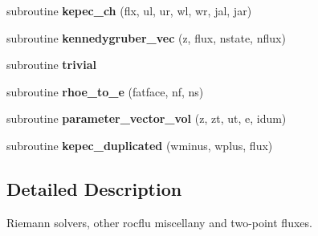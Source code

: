 \begin{DoxyCompactItemize}
\item 
\hypertarget{fluxfn_8f_a59e9fe9c53edce67292dbcb47f7c3853}{subroutine {\bfseries kepec\-\_\-ch} (flx, ul, ur, wl, wr, jal, jar)}\label{fluxfn_8f_a59e9fe9c53edce67292dbcb47f7c3853}

\item 
\hypertarget{fluxfn_8f_a25cb36e6b50d76a9d6d788b9c3656808}{subroutine {\bfseries kennedygruber\-\_\-vec} (z, flux, nstate, nflux)}\label{fluxfn_8f_a25cb36e6b50d76a9d6d788b9c3656808}

\item 
\hypertarget{fluxfn_8f_abf0b8321ecdfdf41f3a2259935c250c9}{subroutine {\bfseries trivial}}\label{fluxfn_8f_abf0b8321ecdfdf41f3a2259935c250c9}

\item 
\hypertarget{fluxfn_8f_a3263d754d306110417d51b61cc67a28b}{subroutine {\bfseries rhoe\-\_\-to\-\_\-e} (fatface, nf, ns)}\label{fluxfn_8f_a3263d754d306110417d51b61cc67a28b}

\item 
\hypertarget{fluxfn_8f_a3264aa63a47559ee42fcf884419d86ca}{subroutine {\bfseries parameter\-\_\-vector\-\_\-vol} (z, zt, ut, e, idum)}\label{fluxfn_8f_a3264aa63a47559ee42fcf884419d86ca}

\item 
\hypertarget{fluxfn_8f_ac2c150a9f3b7c48db9387a5d1840ee5d}{subroutine {\bfseries kepec\-\_\-duplicated} (wminus, wplus, flux)}\label{fluxfn_8f_ac2c150a9f3b7c48db9387a5d1840ee5d}

\end{DoxyCompactItemize}


\subsection{Detailed Description}
Riemann solvers, other rocflu miscellany and two-\/point fluxes. 